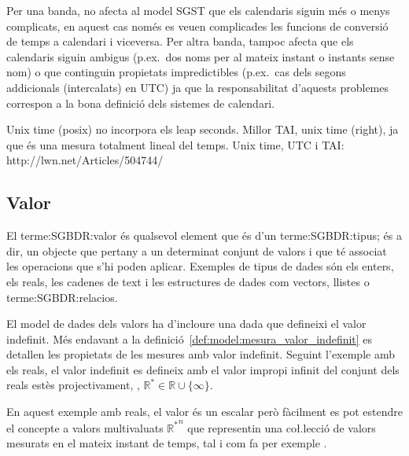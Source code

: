 Per una banda, no afecta al model SGST que els calendaris siguin més o
menys complicats, en aquest cas només es veuen complicades les
funcions de conversió de temps a calendari i viceversa.  Per altra
banda, tampoc afecta que els calendaris siguin ambigus (p.ex.\ dos
noms per al mateix instant o instants sense nom) o que continguin
propietats impredictibles (p.ex.\ cas dels segons addicionals
(intercalats) en UTC) ja que la responsabilitat d'aquests problemes
correspon a la bona definició dels sistemes de calendari.

\todo{}
Unix time (posix) no incorpora els leap seconds.
Millor TAI, unix time (right), ja que és una mesura totalment lineal del temps. 
Unix time, UTC i TAI: http://lwn.net/Articles/504744/


\subsection{Valor}
\label{sec:sgst:valor}

El \gls{terme:SGBDR:valor} és qualsevol element que és d'un
\gls{terme:SGBDR:tipus}; és a dir, un objecte que
pertany a un determinat conjunt de valors i que té associat les
operacions que s'hi poden aplicar. Exemples de tipus de dades són els
enters, els reals, les cadenes de text i les estructures de dades com
vectors, llistes o \glspl{terme:SGBDR:relacio}.  



El model de dades dels valors ha d'incloure una dada que defineixi el
valor indefinit. Més endavant a la
definició~\ref{def:model:mesura_valor_indefinit} es detallen les
propietats de les mesures amb valor indefinit. Seguint l'exemple amb
els reals, el valor indefinit es defineix amb el valor impropi infinit
del conjunt dels reals estès
projectivament, \parencite{cantrell:projectivelyextendedreal},
$\mathbb{R}^*\in\mathbb{R} \cup \{\infty\}$.


En aquest exemple amb reals, el valor és un escalar però fàcilment es
pot estendre el concepte a valors multivaluats ${\mathbb{R}^*}^n$ que
representin una co\l.lecció de valors mesurats en el mateix instant de
temps, tal i com fa per exemple \textcite{assfalg08:thesis}.







